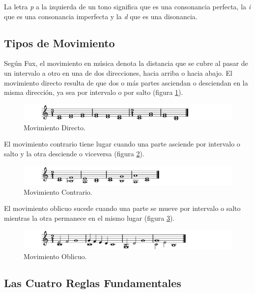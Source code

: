\documentclass[letterpaper,12pt]{book}
\theoremstyle{definition} \newtheorem{Def}{Definición}[chapter]
\theoremstyle{definition} \newtheorem{Teo}{Teorema}[chapter]
\theoremstyle{definition} \newtheorem{Pro}{Proposición}[chapter]
\theoremstyle{definition} \newtheorem{Lema}{Lema}[chapter]
\begin{document}
La letra \emph{p} a la izquierda de un tono significa que es una consonancia perfecta, la \emph{i} que es una consonancia imperfecta y la \emph{d} que es una disonancia.

\subsection{Tipos de Movimiento}

Según Fux, el movimiento en música denota la distancia que se cubre al pasar de un intervalo a otro en una de dos direcciones, hacia arriba o hacia abajo. El movimiento directo resulta de que dos o más partes asciendan o desciendan en la misma dirección, ya sea por intervalo o por salto (figura \ref{Directo}).
\begin{figure}[h]
\centering
\includegraphics[angle=0, width=1\textwidth]{Directo.png}
\caption{\label{Directo} Movimiento Directo.}
\end{figure}

El movimiento contrario tiene lugar cuando una parte asciende por intervalo o salto y la otra desciende o viceversa (figura \ref{Contrario}).
\begin{figure}[h]
\centering 
\includegraphics[angle=0, width=1\textwidth]{Contrario.png} 
\caption{\label{Contrario}Movimiento Contrario.}
\end{figure}

El movimiento oblicuo sucede cuando una parte se mueve por intervalo o salto mientras la otra permanece en el mismo lugar (figura \ref{Oblicuo}).
\begin{figure}[h] 
\centering 
\includegraphics[angle=0, width=1\textwidth]{Oblicuo.png} 
\caption{\label{Oblicuo}Movimiento Oblicuo.}
\end{figure}

\subsection{Las Cuatro Reglas Fundamentales}
\end{document}
